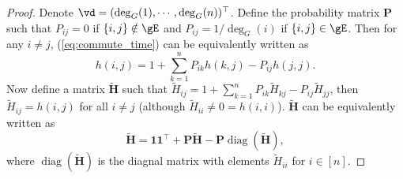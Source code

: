 \documentclass{article} %
\newcommand*{\diag}{\operatorname{diag}}
\begin{document}
\begin{proof}
Denote $\vd=(\deg_G(1),\cdots,\deg_G(n))^\top$. Define the probability matrix $\mathbf P$ such that $P_{ij}=0$ if $\{i,j\}\notin\gE$ and $P_{ij}=1/\deg_G(i)$ if $\{i,j\}\in\gE$. Then for any $i\neq j$, (\ref{eq:commute_time}) can be equivalently written as
\begin{equation}
    h(i,j)=1+\sum_{k=1}^n P_{ik}h(k,j)-P_{ij} h(j,j).
\end{equation}
Now define a matrix $\tilde{\mathbf H}$ such that $\tilde H_{ij}=1+\sum_{k=1}^n P_{ik}\tilde H_{kj}-P_{ij} \tilde H_{jj}$, then $\tilde H_{ij}=h(i,j)$ for all $i\neq j$ (although $\tilde H_{ii}\neq 0=h(i,i)$). $\tilde{\mathbf H}$ can be equivalently written as
\begin{equation}
\label{eq:proof_rd_1}
    \tilde{\mathbf H}=\mathbf 1\mathbf 1^\top+\mathbf P\tilde{\mathbf H}-\mathbf P\diag (\tilde{\mathbf H}),
\end{equation}
where $\diag(\tilde{\mathbf H})$ is the diagnal matrix with elements $\tilde H_{ii}$ for $i\in[n]$.


\end{proof}
\end{document}
